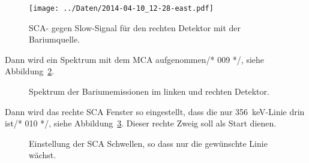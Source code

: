 \begin{figure}[htbp]
    \centering
    \hfill
    \texttt{[image: ../Daten/2014-04-10\_12-28-east.pdf]}
    \caption{%
        SCA- gegen Slow-Signal für den rechten Detektor mit der Bariumquelle.
    }
    \label{fig:eine_pulshoehe_ba}
\end{figure}

Dann wird ein Spektrum mit dem MCA aufgenommen/* 009 */, siehe Abbildung~\ref{mca:ba_spek}.

\begin{figure}[htbp]
    \centering
    \hfill
    \caption{%
        Spektrum der Bariumemissionen im linken und rechten Detektor.
    }
    \label{mca:ba_spek}
\end{figure}

Dann wird das rechte SCA Fenster so eingestellt, dass die nur
\SI{356}{\kilo\electronvolt}-Linie drin ist/* 010 */, siehe
Abbildung~\ref{mca:ba_spek_sca}. Dieser rechte Zweig soll als Start dienen.

\begin{figure}[htbp]
    \centering
    \hfill
    \caption{%
        Einstellung der SCA Schwellen, so dass nur die gewünschte Linie wächst.
    }
    \label{mca:ba_spek_sca}
\end{figure}

